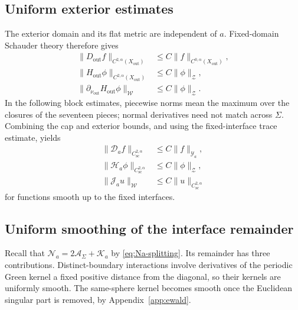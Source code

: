 \documentclass[11pt,a4paper,twoside]{article}
\numberwithin{equation}{section}
\theoremstyle{definition}
\theoremstyle{remark}
\begin{document}
\subsection{Uniform exterior estimates}
\label{subsec:uniform-outer-estimates}

The exterior domain and its flat metric are independent of \(a\).
Fixed-domain Schauder theory therefore gives
\[
\begin{aligned}
\|D_{\mathrm{out}}f\|_{C^{2,\alpha}(X_{\mathrm{out}})}
&\le C\|f\|_{C^{0,\alpha}(X_{\mathrm{out}})},\\
\|H_{\mathrm{out}}\phi\|_{C^{2,\alpha}(X_{\mathrm{out}})}
&\le C\|\phi\|_{\mathcal Z},\\
\|\partial_{\nu_{\mathrm{out}}}H_{\mathrm{out}}\phi\|_{\mathcal W}
&\le C\|\phi\|_{\mathcal Z}.
\end{aligned}
\]
In the following block estimates, piecewise norms mean the maximum
over the closures of the seventeen pieces; normal derivatives need
not match across \(\Sigma\). Combining the cap and exterior bounds,
and using the fixed-interface trace estimate, yields
\[
\begin{aligned}
\|\mathcal D_af\|_{C_{\mathrm{sc}}^{2,\alpha}}
&\le C\|f\|_{\mathcal Y_a},\\
\|\mathcal H_a\phi\|_{C_{\mathrm{sc}}^{2,\alpha}}
&\le C\|\phi\|_{\mathcal Z},\\
\|\mathcal J_au\|_{\mathcal W}
&\le C\|u\|_{C_{\mathrm{sc}}^{2,\alpha}}
\end{aligned}
\]
for functions smooth up to the fixed interfaces.

\subsection{Uniform smoothing of the interface remainder}
\label{subsec:uniform-high-modes}

Recall that \(\mathcal N_a=2\mathcal A_\Sigma+\mathcal K_a\)
by \eqref{eq:Na-splitting}. Its remainder has three contributions.
Distinct-boundary interactions involve derivatives of the periodic
Green kernel a fixed positive distance from the diagonal, so their
kernels are uniformly smooth. The same-sphere kernel becomes smooth
once the Euclidean singular part is removed, by
Appendix~\ref{app:ewald}.
\end{document}
